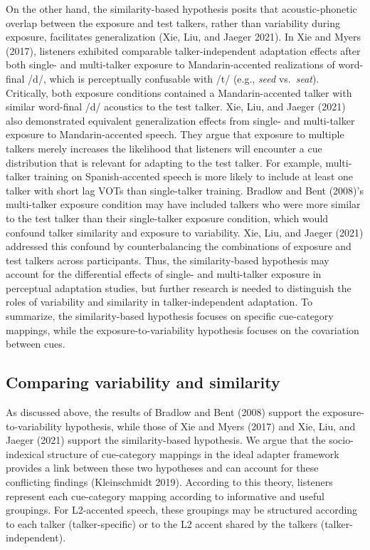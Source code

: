 \documentclass[
  preprint]{elsarticle}
\begin{document}
On the other hand, the similarity-based hypothesis posits that acoustic-phonetic overlap between the exposure and test talkers, rather than variability during exposure, facilitates generalization (Xie, Liu, and Jaeger 2021).
In Xie and Myers (2017), listeners exhibited comparable talker-independent adaptation effects after both single- and multi-talker exposure to Mandarin-accented realizations of word-final /d/, which is perceptually confusable with /t/ (e.g., \emph{seed} vs.~\emph{seat}).
Critically, both exposure conditions contained a Mandarin-accented talker with similar word-final /d/ acoustics to the test talker.
Xie, Liu, and Jaeger (2021) also demonstrated equivalent generalization effects from single- and multi-talker exposure to Mandarin-accented speech.
They argue that exposure to multiple talkers merely increases the likelihood that listeners will encounter a cue distribution that is relevant for adapting to the test talker.
For example, multi-talker training on Spanish-accented speech is more likely to include at least one talker with short lag VOTs than single-talker training.
Bradlow and Bent (2008)'s multi-talker exposure condition may have included talkers who were more similar to the test talker than their single-talker exposure condition, which would confound talker similarity and exposure to variability.
Xie, Liu, and Jaeger (2021) addressed this confound by counterbalancing the combinations of exposure and test talkers across participants.
Thus, the similarity-based hypothesis may account for the differential effects of single- and multi-talker exposure in perceptual adaptation studies, but further research is needed to distinguish the roles of variability and similarity in talker-independent adaptation.
To summarize, the similarity-based hypothesis focuses on specific cue-category mappings, while the exposure-to-variability hypothesis focuses on the covariation between cues.

\hypertarget{comparing-variability-and-similarity}{%
\subsection{Comparing variability and similarity}\label{comparing-variability-and-similarity}}

As discussed above, the results of Bradlow and Bent (2008) support the exposure-to-variability hypothesis, while those of Xie and Myers (2017) and Xie, Liu, and Jaeger (2021) support the similarity-based hypothesis.
We argue that the socio-indexical structure of cue-category mappings in the ideal adapter framework provides a link between these two hypotheses and can account for these conflicting findings (Kleinschmidt 2019).
According to this theory, listeners represent each cue-category mapping according to informative and useful groupings.
For L2-accented speech, these groupings may be structured according to each talker (talker-specific) or to the L2 accent shared by the talkers (talker-independent).
\end{document}
